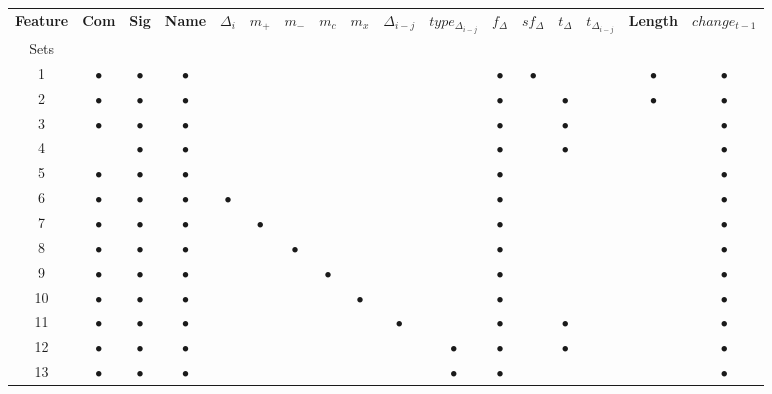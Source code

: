 \begin{landscape}
\thispagestyle{empty}
\begin{table}
\begin{center}
    \begin{tabular}{|c|c|c|c|c|c|c|c|c|c|c|c|c|c|c|c|c|}
        \hline
        \textbf{Feature} & \textbf{Com} & \textbf{Sig} & \textbf{Name} & $\Delta_i$ & $m_+$ & $m_-$ & $m_c$ & $m_x$ & $\Delta_{i-j}$ & $type_{\Delta_{i-j}}$ & $f_{\Delta}$ & $sf_{\Delta}$ & $t_\Delta$ & $t_{\Delta_{i-j}}$ & \textbf{Length} & $change_{t-1}$ \\
        Sets & & & & & & & & & & & & & & & & \\ 
        \hline
        1 & $\bullet$ & $\bullet$ & $\bullet$ & & & & & & & & $\bullet$ & $\bullet$ & & & $\bullet$ & $\bullet$ \\
        2 & $\bullet$ & $\bullet$ & $\bullet$ & & & & & & & & $\bullet$ & & $\bullet$ & & $\bullet$ & $\bullet$ \\
        3 & $\bullet$ & $\bullet$ & $\bullet$ & & & & & & & & $\bullet$ & & $\bullet$ & & & $\bullet$ \\
        4 & & $\bullet$ & $\bullet$ & & & & & & & & $\bullet$ & & $\bullet$ & & & $\bullet$ \\
        5 & $\bullet$ & $\bullet$ & $\bullet$ & & & & & & & & $\bullet$ & & & & & $\bullet$ \\
        6 & $\bullet$ & $\bullet$ & $\bullet$ & $\bullet$ & & & & & & & $\bullet$ & & & & & $\bullet$ \\
        7 & $\bullet$ & $\bullet$ & $\bullet$ & & $\bullet$ & & & & & & $\bullet$ & & & & & $\bullet$ \\
        8 & $\bullet$ & $\bullet$ & $\bullet$ & & & $\bullet$ & & & & & $\bullet$ & & & & & $\bullet$ \\
        9 & $\bullet$ & $\bullet$ & $\bullet$ & & & & $\bullet$ & & & & $\bullet$ & & & & & $\bullet$ \\
        10 & $\bullet$ & $\bullet$ & $\bullet$ & & & & & $\bullet$ & & & $\bullet$ & & & & & $\bullet$ \\
        11 & $\bullet$ & $\bullet$ & $\bullet$ & & & & & & $\bullet$ & & $\bullet$ & & $\bullet$ & & & $\bullet$ \\
        12 & $\bullet$ & $\bullet$ & $\bullet$ & & & & & & & $\bullet$ & $\bullet$ & & $\bullet$ & & & $\bullet$ \\
        13 & $\bullet$ & $\bullet$ & $\bullet$ & & & & & & & $\bullet$ & $\bullet$ & & & & & $\bullet$ \\

\end{tabular}
\end{center}
\end{table}
\end{landscape}
